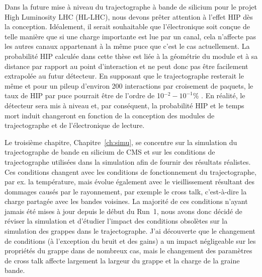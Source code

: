 Dans la future mise à niveau du trajectographe à bande de silicium pour le projet High Luminosity LHC (HL-LHC), nous devons prêter attention à l’effet HIP dès la conception. Idéalement, il serait souhaitable que l’électronique soit conçue de telle manière que si une charge importante est lue par un canal, cela n’affecte pas les autres canaux appartenant à la même puce que c’est le cas actuellement. La probabilité HIP calculée dans cette thèse est liée à la géométrie du module et à sa distance par rapport au point d'interaction et ne peut donc pas être facilement extrapolée au futur détecteur. En supposant que le trajectographe resterait le même et pour un pileup d'environ 200 interactions par croisement de paquets, le taux de HIP par puce pourrait être de l'ordre de 10$^{-2}-10 ^{-1}$\% . En réalité, le détecteur sera mis à niveau et, par conséquent, la probabilité HIP et le temps mort induit changeront en fonction de la conception des modules de trajectographe et de l’électronique de lecture.

\vspace*{1cm}




Le troisième chapitre, Chapitre~\ref{ch:simu}, se concentre sur la simulation du trajectographe de bande en silicium de CMS et sur les conditions de trajectographe utilisées dans la simulation afin de fournir des résultats réalistes. Ces conditions changent avec les conditions de fonctionnement du trajectographe, par ex. la température, mais évolue également avec le vieillissement résultant des dommages causés par le rayonnement, par exemple le cross talk, c'est-à-dire la charge partagée avec les bandes voisines. La majorité de ces conditions n’ayant jamais été mises à jour depuis le début du Run~1, nous avons donc décidé de réviser la simulation et d’étudier l’impact des conditions obsolètes sur la simulation des grappes dans le trajectographe. J'ai découverte que le changement de conditions (à l'exception du bruit et des gains) a un impact négligeable sur les propriétés du grappe dans de nombreux cas, mais le changement des paramètres de cross talk affecte largement la largeur du grappe et la charge de la graine bande.

